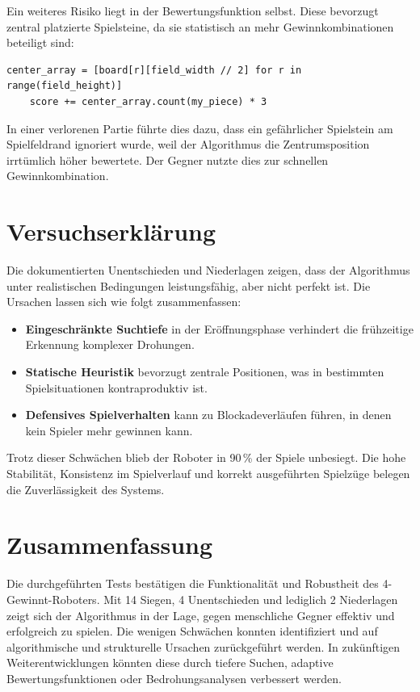 Ein weiteres Risiko liegt in der Bewertungsfunktion selbst. Diese bevorzugt zentral platzierte Spielsteine, da sie statistisch an mehr Gewinnkombinationen beteiligt sind:

\begin{lstlisting}[style=pythonstyle]
	center_array = [board[r][field_width // 2] for r in range(field_height)]
	score += center_array.count(my_piece) * 3
\end{lstlisting}

In einer verlorenen Partie führte dies dazu, dass ein gefährlicher Spielstein am Spielfeldrand ignoriert wurde, weil der Algorithmus die Zentrumsposition irrtümlich höher bewertete. Der Gegner nutzte dies zur schnellen Gewinnkombination.

\section{Versuchserklärung}

Die dokumentierten Unentschieden und Niederlagen zeigen, dass der Algorithmus unter realistischen Bedingungen leistungsfähig, aber nicht perfekt ist. Die Ursachen lassen sich wie folgt zusammenfassen:

\begin{itemize}
	\item \textbf{Eingeschränkte Suchtiefe} in der Eröffnungsphase verhindert die frühzeitige Erkennung komplexer Drohungen.
	\item \textbf{Statische Heuristik} bevorzugt zentrale Positionen, was in bestimmten Spielsituationen kontraproduktiv ist.
	\item \textbf{Defensives Spielverhalten} kann zu Blockadeverläufen führen, in denen kein Spieler mehr gewinnen kann.
\end{itemize}

Trotz dieser Schwächen blieb der Roboter in 90\,\% der Spiele unbesiegt. Die hohe Stabilität, Konsistenz im Spielverlauf und korrekt ausgeführten Spielzüge belegen die Zuverlässigkeit des Systems.

\section{Zusammenfassung}

Die durchgeführten Tests bestätigen die Funktionalität und Robustheit des 4-Gewinnt-Roboters. Mit 14 Siegen, 4 Unentschieden und lediglich 2 Niederlagen zeigt sich der Algorithmus in der Lage, gegen menschliche Gegner effektiv und erfolgreich zu spielen. Die wenigen Schwächen konnten identifiziert und auf algorithmische und strukturelle Ursachen zurückgeführt werden. In zukünftigen Weiterentwicklungen könnten diese durch tiefere Suchen, adaptive Bewertungsfunktionen oder Bedrohungsanalysen verbessert werden.

